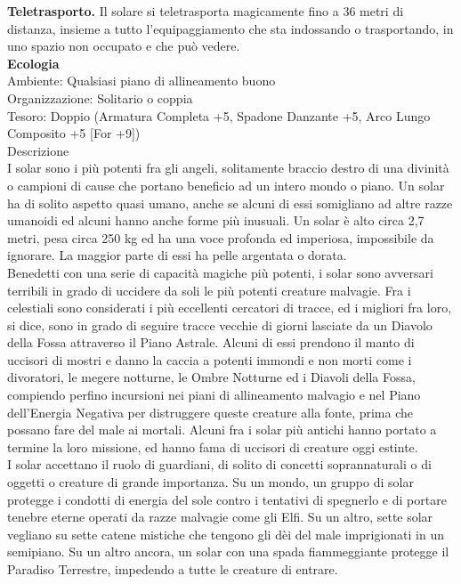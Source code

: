 \begin{multicols}{2}
\textbf{Teletrasporto.} Il solare si teletrasporta magicamente fino a 36 metri di distanza, insieme a tutto l'equipaggiamento che sta indossando o trasportando, in uno spazio non occupato e che può vedere.\\
\textbf{Ecologia}\\
Ambiente: Qualsiasi piano di allineamento buono\\
Organizzazione: Solitario o coppia\\
Tesoro: Doppio (Armatura Completa +5, Spadone Danzante +5, Arco Lungo Composito +5 [For +9])\\
Descrizione\\
I solar sono i più potenti fra gli angeli, solitamente braccio destro di una divinità o campioni di cause che portano beneficio ad un intero mondo o piano. Un solar ha di solito aspetto quasi umano, anche se alcuni di essi somigliano ad altre razze umanoidi ed alcuni hanno anche forme più inusuali. Un solar è alto circa 2,7 metri, pesa circa 250 kg ed ha una voce profonda ed imperiosa, impossibile da ignorare. La maggior parte di essi ha pelle argentata o dorata.\\
Benedetti con una serie di capacità magiche più potenti, i solar sono avversari terribili in grado di uccidere da soli le più potenti creature malvagie. Fra i celestiali sono considerati i più eccellenti cercatori di tracce, ed i migliori fra loro, si dice, sono in grado di seguire tracce vecchie di giorni lasciate da un Diavolo della Fossa attraverso il Piano Astrale. Alcuni di essi prendono il manto di uccisori di mostri e danno la caccia a potenti immondi e non morti come i divoratori, le megere notturne, le Ombre Notturne ed i Diavoli della Fossa, compiendo perfino incursioni nei piani di allineamento malvagio e nel Piano dell'Energia Negativa per distruggere queste creature alla fonte, prima che possano fare del male ai mortali. Alcuni fra i solar più antichi hanno portato a termine la loro missione, ed hanno fama di uccisori di creature oggi estinte.\\
I solar accettano il ruolo di guardiani, di solito di concetti soprannaturali o di oggetti o creature di grande importanza. Su un mondo, un gruppo di solar protegge i condotti di energia del sole contro i tentativi di spegnerlo e di portare tenebre eterne operati da razze malvagie come gli Elfi. Su un altro, sette solar vegliano su sette catene mistiche che tengono gli dèi del male imprigionati in un semipiano. Su un altro ancora, un solar con una spada fiammeggiante protegge il Paradiso Terrestre, impedendo a tutte le creature di entrare.\\

\end{multicols}
